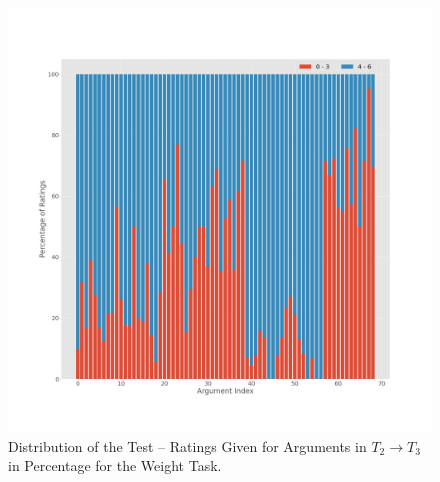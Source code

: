 \begin{figure}[!ht]
    \centering
    \includegraphics[width=1\textwidth]{images/T2_T3_test_Weight.jpg}
    \caption{Distribution of the Test – Ratings Given for Arguments in $T_2 \to T_3$ in Percentage for the Weight Task.}
    \label{fig:conviction_t2_t3_test}
\end{figure}